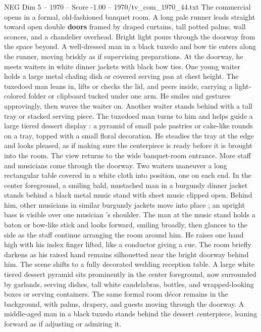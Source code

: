 \begin{textsample}{NEG Dim 5 – 1970 – Score -1.00 – 1970/tv\_com\_1970\_44.txt}  \label{ex:f5_neg_014}
The commercial opens in a formal, old-fashioned banquet room.
A long pale runner leads straight toward open double \textbf{doors} framed by draped curtains, tall potted palms, wall sconces, and a chandelier overhead.
Bright light pours through the doorway from the space beyond.
A well-dressed man in a black tuxedo and bow tie enters along the runner, moving briskly as if supervising preparations.
At the doorway, he meets waiters in white dinner jackets with black bow ties.
One young waiter holds a large metal chafing dish or covered serving pan at chest height.
The tuxedoed man leans in, lifts or checks the lid, and peers inside, carrying a light-colored folder or clipboard tucked under one arm.
He smiles and gestures approvingly, then waves the waiter on.
Another waiter stands behind with a tall tray or stacked serving piece.
The tuxedoed man turns to him and helps guide a large tiered dessert display : a pyramid of small pale pastries or cake-like rounds on a tray, topped with a small floral decoration.
He steadies the tray at the edge and looks pleased, as if making sure the centerpiece is ready before it is brought into the room.
The view returns to the wide banquet-room entrance.
More staff and musicians come through the doorway.
Two waiters maneuver a long rectangular table covered in a white cloth into position, one on each end.
In the center foreground, a smiling bald, mustached man in a burgundy dinner jacket stands behind a black metal music stand with sheet music clipped open.
Behind him, other musicians in similar burgundy jackets move into place ; an upright bass is visible over one musician ’s shoulder.
The man at the music stand holds a baton or bow-like stick and looks forward, smiling broadly, then glances to the side as the staff continue arranging the room around him.
He raises one hand high with his index finger lifted, like a conductor giving a cue.
The room briefly darkens as his raised hand remains silhouetted near the bright doorway behind him.
The scene shifts to a fully decorated wedding reception table.
A large white tiered dessert pyramid sits prominently in the center foreground, now surrounded by garlands, serving dishes, tall white candelabras, bottles, and wrapped-looking boxes or serving containers.
The same formal room décor remains in the background, with palms, drapery, and guests moving through the doorway.
A middle-aged man in a black tuxedo stands behind the dessert centerpiece, leaning forward as if adjusting or admiring it.

\end{textsample}
